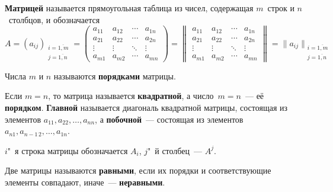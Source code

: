  \textbf{Матрицей} называется прямоугольная таблица из чисел, содержащая $m$~строк и $n$~столбцов, и обозначается
\begin{equation*}
A = (a_{ij})_{\begin{smallmatrix}
i = \overline{1, m} \\
j = \overline{1, n}
\end{smallmatrix}} =
\begin{pmatrix}
a_{11} & a_{12} & \cdots & a_{1n} \\
a_{21} & a_{22} & \cdots & a_{2n} \\
\vdots & \vdots & \ddots & \vdots \\
a_{m1} & a_{m2} & \cdots & a_{mn}
\end{pmatrix} =
\begin{Vmatrix}
a_{11} & a_{12} & \cdots & a_{1n} \\
a_{21} & a_{22} & \cdots & a_{2n} \\
\vdots & \vdots & \ddots & \vdots \\
a_{m1} & a_{m2} & \cdots & a_{mn}
\end{Vmatrix} =
\|a_{ij}\|_{\begin{smallmatrix}
i = \overline{1, m} \\
j = \overline{1, n}
\end{smallmatrix}}
\end{equation*}

Числа $m$ и $n$ называются \textbf{порядками} матрицы.

Если $m = n$, то матрица называется \textbf{квадратной}, а число~$m = n$~--- её \textbf{порядком}.
\textbf{Главной} называется диагональ квадратной матрицы, состоящая из элементов $a_{11}, a_{22}, \ldots, a_{nn}$, а \textbf{побочной}~--- состоящая из элементов $a_{n1}, a_{n-1\, 2}, \ldots, a_{1n}$.

$i$"~я строка матрицы обозначается $A_i$, $j$"~й столбец~--- $A^j$.

Две матрицы называются \textbf{равными}, если их порядки и соответствующие элементы совпадают, иначе~--- \textbf{неравными}.